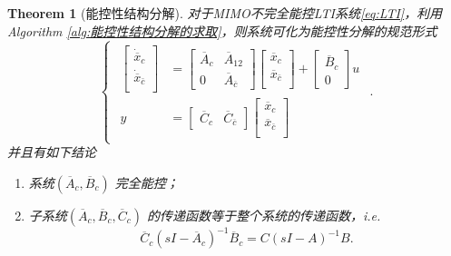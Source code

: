 \documentclass[14pt,a4paper]{article}
\theoremstyle{plain}
\newtheorem{thm}{Theorem}[section]
\theoremstyle{definition}
\theoremstyle{remark}
\theoremstyle{plain}
\theoremstyle{plain}
\theoremstyle{plain}
\theoremstyle{definition}
\theoremstyle{remark}
\numberwithin{equation}{section}
\begin{document}
				\begin{thm}[能控性结构分解]  
				\label{the:能控性结构分解}
				对于MIMO不完全能控LTI系统\eqref{eq:LTI}，利用Algorithm \ref{alg:能控性结构分解的求取}，则系统可化为能控性分解的规范形式
				\begin{equation}
				\label{eq:ctrl_decmp}
					\begin{cases}
						\begin{aligned}
							\begin{bmatrix}
								\dot{\overline{x}}_c\\
								\dot{\overline{x}}_{\bar c}\\
							\end{bmatrix} &= \begin{bmatrix}
							\overline{A}_c & \overline{A}_{12} \\ 
							0 & \overline{A}_{\overline{c}}
							\end{bmatrix}  
							\begin{bmatrix}
								{\overline{x}}_c\\
								{\overline{x}}_{\bar c}\\
							\end{bmatrix} + \begin{bmatrix}
								\overline{B}_c \\
								0
							\end{bmatrix} u \\ 
							y &= \begin{bmatrix}
								\overline{C}_c & \overline{C}_{\overline{c}} 
							\end{bmatrix} 
							\begin{bmatrix}
								{\overline{x}}_c\\
								{\overline{x}}_{\bar c}\\
							\end{bmatrix} 
						\end{aligned}  
					\end{cases} 
				.\end{equation}
				并且有如下结论 
				\begin{enumerate}[(1)]
					\item 系统$\left( \overline{A}_c, \overline{B}_c \right) $ 完全能控；
					\item 子系统$\left( \overline{A}_c, \overline{B}_c, \overline{C}_c \right)$ 的传递函数等于整个系统的传递函数，i.e. 
						\[
							\overline{C}_c \left( sI - \overline{A}_c \right)^{-1} \overline{B}_c = C(sI-A)^{-1}B
						.\] 
				\end{enumerate} 
				\end{thm} 
\end{document}
